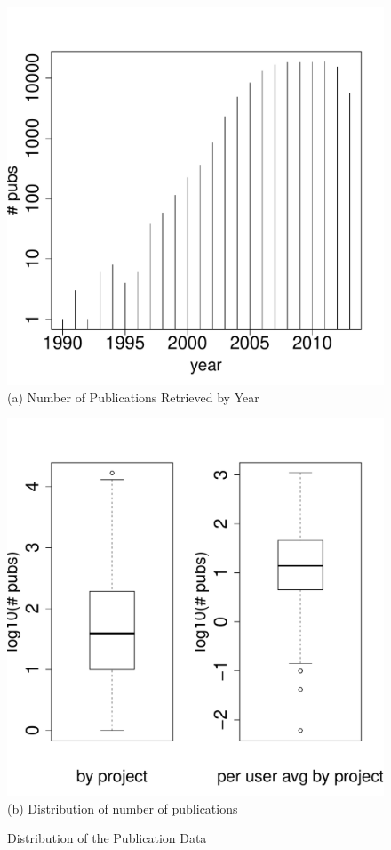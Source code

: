 \documentclass{sig-alternate}
\begin{document}
\begin{figure}[!htb] 
\begin{minipage}[t]{0.22\textwidth}
  \centering 
    \includegraphics[width=1.0\columnwidth]{images/21_pubs_year_distribution.pdf} 
    (a) Number of Publications Retrieved by Year
\ \
\end{minipage}
\begin{minipage}[t]{0.22\textwidth}
  \centering 
    \includegraphics[width=1.0\columnwidth]{images/01_dist_npubs_proj.pdf} 
    (b) Distribution of number of publications
\end{minipage}

\caption{Distribution of the Publication Data}\label{F:dist-npubs}
\end{figure} 
\end{document}
